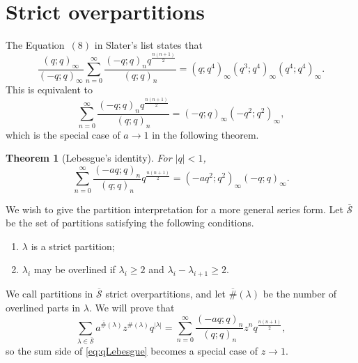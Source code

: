 \documentclass[12pt]{amsart}
\newtheorem{theorem}{Theorem}[section]
\theoremstyle{definition}
\theoremstyle{remark}
\numberwithin{equation}{section}
\begin{document}
\section{Strict overpartitions}\label{sec:SlaterList5}

The Equation~$(8)$ in Slater's list states that
\begin{equation}\label{eq:SlaterList7}
\frac{(q;q)_{\infty}}{(-q;q)_{\infty}}\sum_{n=0}^{\infty}\frac{(-q;q)_{n}q^{\frac{n(n+1)}{2}}}{(q;q)_{n}}=(q;q^4)_{\infty}(q^3;q^4)_{\infty}(q^4;q^4)_{\infty}.  
\end{equation}
This is equivalent to
\begin{equation}\label{eq:SlaterList7Rewrite}
\sum_{n=0}^{\infty}\frac{(-q;q)_{n}q^{\frac{n(n+1)}{2}}}{(q;q)_{n}}=(-q;q)_{\infty}(-q^2;q^2)_{\infty},   
\end{equation}
which is the special case of $a\to1$ in the following theorem.
\begin{theorem}[Lebesgue's identity]
For $|q|<1$,
\begin{equation}\label{eq:qLebesgue}
\sum_{n=0}^{\infty}\frac{(-aq;q)_{n}}{(q;q)_n}q^{\frac{n(n+1)}{2}}=(-aq^2;q^2)_{\infty}(-q;q)_{\infty}.
\end{equation}
\end{theorem}
We wish to give the partition interpretation for a more general series form. Let $\overline{\mathcal{S}}$ be the set of partitions satisfying the following conditions.
\begin{enumerate}
    \item $\lambda$ is a strict partition;
    \item $\lambda_i$ may be overlined if $\lambda_{i}\geq2$ and $\lambda_{i}-\lambda_{i+1}\geq2$.
\end{enumerate}
We call partitions in $\overline{\mathcal{S}}$ strict overpartitions, and let $\overline{\#}(\lambda)$ be the number of overlined parts in $\lambda$. We will prove that
\begin{equation}
\sum_{\lambda\in\overline{\mathcal{S}}}a^{\overline{\#}(\lambda)}z^{\#(\lambda)}q^{|\lambda|}=\sum_{n=0}^{\infty}\frac{(-aq;q)_{n}}{(q;q)_{n}}z^{n}q^{\frac{n(n+1)}{2}},
\end{equation}
so the sum side of \eqref{eq:qLebesgue} becomes a special case of $z\to1$.
\end{document}
